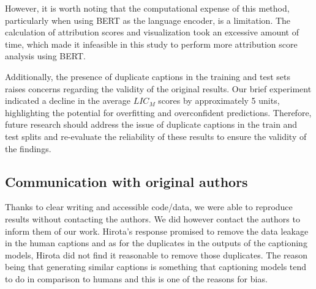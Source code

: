 However, it is worth noting that the computational expense of this method, particularly when using BERT as the language encoder, is a limitation. The calculation of 
attribution scores and visualization took an excessive amount of time, which made it 
infeasible in this study to perform more attribution score analysis using BERT. \newline

Additionally, the presence of duplicate captions in the training and test sets raises concerns regarding the validity of the original results. Our brief experiment indicated a decline in the average $LIC_M$ scores by approximately 5 units, highlighting the potential for overfitting and overconfident predictions. Therefore, future research should address the issue of duplicate captions in the train and test splits and re-evaluate the reliability of these results to ensure the validity of the findings.




\subsection{Communication with original authors}
Thanks to clear writing and accessible code/data, we were able to reproduce results without contacting the authors. We did however contact the authors to inform them of our work. Hirota's response promised to remove the data leakage in the human captions and as for the duplicates in the outputs of the captioning models, Hirota did not find it reasonable to remove those duplicates. The reason being that generating similar captions is something that captioning models tend to do in comparison to humans and this is one of the reasons for bias.

